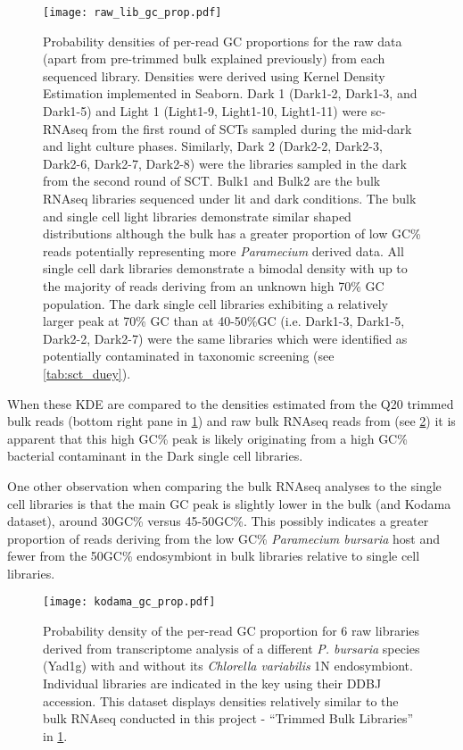 \begin{figure}[h!]
    \texttt{[image: raw\_lib\_gc\_prop.pdf]}
    \caption[GC densities of libraries]{Probability densities of per-read GC proportions for the raw data (apart from pre-trimmed bulk explained previously)
        from each sequenced library.
        Densities were derived using Kernel Density Estimation implemented in Seaborn. 
        Dark 1 (Dark1-2, Dark1-3, and Dark1-5) and Light 1 (Light1-9, Light1-10, Light1-11) 
        were sc-RNAseq from the first round of SCTs sampled during the mid-dark and light 
        culture phases.  Similarly, Dark 2 (Dark2-2, Dark2-3, Dark2-6, Dark2-7, Dark2-8)
        were the libraries sampled in the dark from the second round of SCT.  Bulk1 and Bulk2
        are the bulk RNAseq libraries sequenced under lit and dark conditions. 
        The bulk and single cell light libraries demonstrate similar shaped distributions
        although the bulk has a greater proportion of low GC\% reads potentially representing
        more \textit{Paramecium} derived data. All single cell dark libraries 
        demonstrate a bimodal density with up to the majority of reads deriving 
        from an unknown high 70\% GC population. The dark single cell libraries
        exhibiting a relatively larger peak at 70\% GC than at 40-50\%GC (i.e.
        Dark1-3, Dark1-5, Dark2-2, Dark2-7) were
        the same libraries which were identified as potentially contaminated
        in taxonomic screening (see \cref{tab:sct_duey}).
    }
    \label{fig:gc_prop_raw}
\end{figure}

When these KDE are compared to the densities estimated from the Q20 trimmed
bulk reads (bottom right pane in \cref{fig:gc_prop_raw}) and 
raw bulk RNAseq reads from \citep{Kodama2014} (see \cref{fig:gc_prop_kodama}) 
it is apparent that this high GC\% peak is likely originating from
a high GC\% bacterial contaminant in the Dark single cell libraries.  

One other observation when comparing the bulk RNAseq analyses to the single cell
libraries is that the main GC peak is slightly lower in the bulk (and Kodama dataset), 
around 30GC\% versus 45-50GC\%.
This possibly indicates a greater proportion of reads deriving from the low
GC\% \textit{Paramecium bursaria} host and fewer from the 50GC\% endosymbiont
in bulk libraries relative to single cell libraries.  

\begin{figure}[h!]
	\centering
    \texttt{[image: kodama\_gc\_prop.pdf]}
    \caption[GC densities of \textit{P. bursaria} Yad1g - \textit{C. variabilis} 1N]{Probability density of the per-read GC proportion for 6 raw libraries derived from
        \citep{Kodama2014} transcriptome analysis of a different \textit{P. bursaria} species (Yad1g)
        with and without its \textit{Chlorella variabilis} 1N endosymbiont. Individual libraries are indicated 
        in the key using their DDBJ accession.        
        This dataset displays densities relatively similar
to the bulk RNAseq conducted in this project - ``Trimmed Bulk Libraries'' in \cref{fig:gc_prop_raw}.}
    \label{fig:gc_prop_kodama}
\end{figure}

